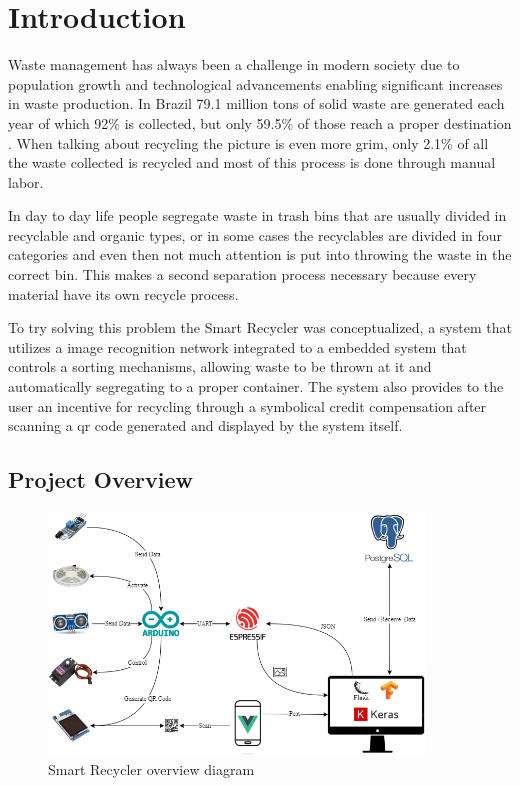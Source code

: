 \documentclass[a4paper,11pt]{article}
\begin{document}
\section{Introduction}
\label{sec:intro}
\noindent

Waste management has always been a challenge in modern society due to population growth and technological advancements enabling significant incre\-ases in waste production. In Brazil 79.1 million tons of solid waste are generated each year \cite{Senado} of which 92\% is collected, but only 59.5\% of those reach a proper destination \cite{Senado}. When talking about recycling the picture is even more grim, only 2.1\% of all the waste collected is recycled \cite{Poder360} and most of this process is done through manual labor.

In day to day life people segregate waste in trash bins that are usually divided in recyclable and organic types, or in some cases the recyclables are divided in four categories and even then not much attention is put into throwing the waste in the correct bin. This makes a second separation process necessary because every material have its own recycle process.

To try solving this problem the Smart Recycler was conceptualized, a system that utilizes a image recognition network integrated to a embedded system that controls a sorting mechanisms, allowing waste to be thrown at it and automatically segregating to a proper container. The system also provides to the user an incentive for recycling through a symbolical credit compensation after scanning a qr code generated and displayed  by the system itself.

\subsection{Project Overview}
\label{subsec:overview}

\begin{figure}[H]
  \centering
  \includegraphics[width=10cm]{Figures/Smart Recycler Diagam.png}
  \caption{\small{Smart Recycler overview diagram}}
  \label{fig:blockDiagram}
\end{figure}
\end{document}
